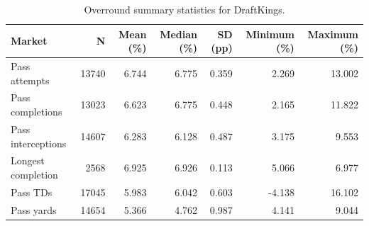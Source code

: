\begin{table}
\caption{Overround summary statistics for DraftKings.}
\label{tab:overround_draftkings}
\begin{tabular}{lrrrrrr}
\toprule
Market & N & Mean (\%) & Median (\%) & SD (pp) & Minimum (\%) & Maximum (\%) \\
\midrule
Pass attempts & 13740 & 6.744 & 6.775 & 0.359 & 2.269 & 13.002 \\
Pass completions & 13023 & 6.623 & 6.775 & 0.448 & 2.165 & 11.822 \\
Pass interceptions & 14607 & 6.283 & 6.128 & 0.487 & 3.175 & 9.553 \\
Longest completion & 2568 & 6.925 & 6.926 & 0.113 & 5.066 & 6.977 \\
Pass TDs & 17045 & 5.983 & 6.042 & 0.603 & -4.138 & 16.102 \\
Pass yards & 14654 & 5.366 & 4.762 & 0.987 & 4.141 & 9.044 \\
\bottomrule
\end{tabular}
\end{table}
